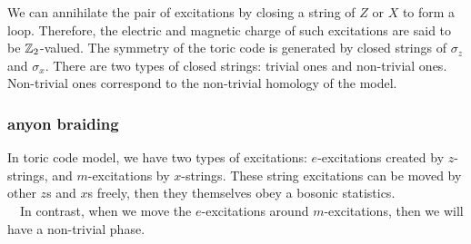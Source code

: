 \documentclass{ltjsarticle}
\theoremstyle{mystyle} %
\numberwithin{equation}{section}
\begin{document}
 We can annihilate the pair of excitations by closing a string of $Z$ or $X$ to form a loop. 
 Therefore, the electric and magnetic charge of such excitations are said to be $\mathbb{Z}_2$-valued. 
 The symmetry of the toric code is generated by closed strings of $\sigma_z$ and $\sigma_x$. 
 There are two types of closed strings: trivial ones and non-trivial ones. 
 Non-trivial ones correspond to the non-trivial homology of the model. 
\subsubsection{anyon braiding}
In toric code model, we have two types of excitations: 
$e$-excitations created by $z$-strings, 
and $m$-excitations by $x$-strings. 
These string excitations can be moved by other $z$s and $x$s freely, 
then they themselves obey a bosonic statistics. \\
　In contrast, when we move the $e$-excitations around $m$-excitations, 
then we will have a non-trivial phase. 
\end{document}
